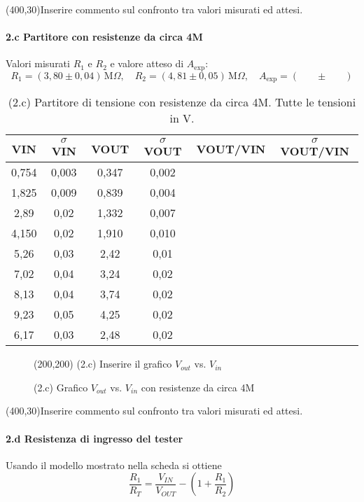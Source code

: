 \documentclass[10pt,a4paper]{article}
\newcommand{\exn}{\phantom{xxx}}
\begin{document}
\framebox(400,30){Inserire commento sul confronto tra valori misurati ed attesi.}


\paragraph{2.c Partitore con resistenze da circa 4M}
Valori misurati $R_1$ e $R_2$ e valore atteso di $A_\mathrm{exp}$:
\[
R_1 = ( 3,80 \pm 0,04 ) \,\mathrm{M}\Omega, \quad
R_2 = ( 4,81 \pm 0,05 ) \,\mathrm{M}\Omega, \quad
A_\mathrm{exp} = ( \exn \pm \exn ) 
\]


\begin{table}[h]
\centering
\begin{tabular}{|c|c|c|c|c|c|}
\hline 
VIN& $\sigma$ VIN  &VOUT	 & $\sigma$ VOUT& VOUT/VIN & $\sigma$ VOUT/VIN \\
\hline 
0,754 & 0,003 & 0,347 & 0,002 & \exn &\exn \\
1,825 & 0,009 & 0,839 & 0,004 & \exn &\exn \\
2,89 & 0,02 & 1,332 & 0,007 & \exn &\exn \\
4,150 & 0,02 & 1,910 & 0,010 & \exn &\exn \\
5,26 & 0,03 & 2,42 & 0,01 & \exn &\exn \\
7,02 & 0,04 & 3,24 & 0,02 & \exn &\exn \\
8,13 & 0,04 & 3,74 & 0,02 & \exn &\exn \\
9,23 & 0,05 & 4,25 & 0,02 & \exn &\exn \\
6,17 & 0,03 & 2,48 & 0,02 & \exn &\exn \\
\hline 
\end{tabular} 
\caption{(2.c) Partitore di tensione con resistenze da circa 4M. Tutte le tensioni in V.\label{t:par2}}
\end{table}


\begin{figure}[h]
\centering
\framebox(200,200){ (2.c) Inserire il grafico $V_{out}$ vs. $V_{in}$ }

\caption{(2.c) Grafico $V_{out}$ vs. $V_{in}$ con resistenze da circa 4M \label{f:par2}}
\end{figure}

\framebox(400,30){Inserire commento sul confronto tra valori misurati ed attesi.}



\paragraph{2.d Resistenza di ingresso del tester}
Usando il modello mostrato nella scheda si ottiene
\[ \frac{R_1}{R_T} =  \frac{V_{IN}}{V_{OUT}} - (1 +  \frac{R_1}{R_2} )
\]
\end{document}
